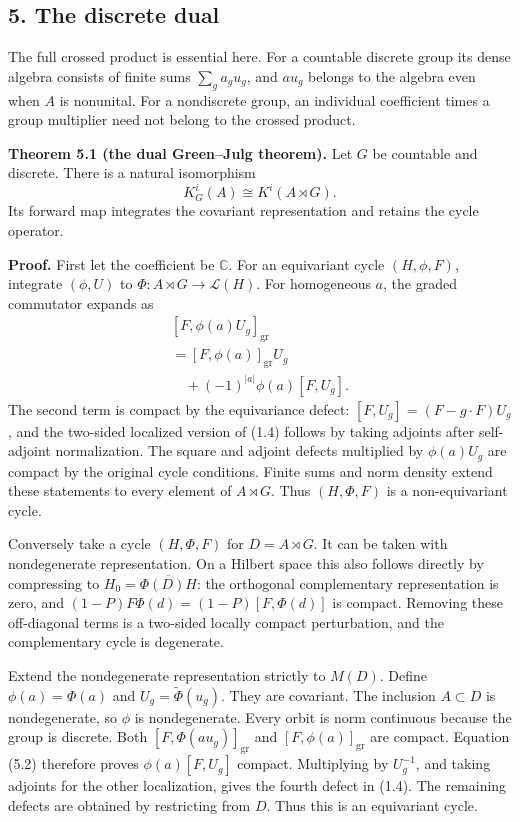 \documentclass[
  11pt,
]{article}
\begin{document}
\subsection{5. The discrete dual}\label{the-discrete-dual}

The full crossed product is essential here. For a countable discrete
group its dense algebra consists of finite sums \(\sum_g a_g u_g\), and
\(a u_g\) belongs to the algebra even when \(A\) is nonunital. For a
nondiscrete group, an individual coefficient times a group multiplier
need not belong to the crossed product.

\textbf{Theorem 5.1 (the dual Green--Julg theorem).} Let \(G\) be
countable and discrete. There is a natural isomorphism \[
K_G^i(A)\cong K^i(A\rtimes G).
\tag{5.1}
\] Its forward map integrates the covariant representation and retains
the cycle operator.

\textbf{Proof.} First let the coefficient be \(\mathbb C\). For an
equivariant cycle \((H,\phi,F)\), integrate \((\phi,U)\) to
\(\Phi:A\rtimes G\to\mathcal L(H)\). For homogeneous \(a\), the graded
commutator expands as \[
\begin{gathered}
{}[F,\phi(a)U_g]_{\mathrm{gr}}\\
 = [F,\phi(a)]_{\mathrm{gr}}U_g\\
 \quad+(-1)^{|a|}\phi(a)[F,U_g].
\end{gathered}
\tag{5.2}
\] The second term is compact by the equivariance defect:
\([F,U_g]=(F-g\cdot F)U_g\), and the two-sided localized version of
(1.4) follows by taking adjoints after self-adjoint normalization. The
square and adjoint defects multiplied by \(\phi(a)U_g\) are compact by
the original cycle conditions. Finite sums and norm density extend these
statements to every element of \(A\rtimes G\). Thus \((H,\Phi,F)\) is a
non-equivariant cycle.

Conversely take a cycle \((H,\Phi,F)\) for \(D=A\rtimes G\). It can be
taken with nondegenerate representation. On a Hilbert space this also
follows directly by compressing to \(H_0=\overline{\Phi(D)H}\): the
orthogonal complementary representation is zero, and
\((1-P)F\Phi(d)=(1-P)[F,\Phi(d)]\) is compact. Removing these
off-diagonal terms is a two-sided locally compact perturbation, and the
complementary cycle is degenerate.

Extend the nondegenerate representation strictly to \(M(D)\). Define
\(\phi(a)=\Phi(a)\) and \(U_g=\widetilde\Phi(u_g)\). They are covariant.
The inclusion \(A\subset D\) is nondegenerate, so \(\phi\) is
nondegenerate. Every orbit is norm continuous because the group is
discrete. Both \([F,\Phi(au_g)]_{\mathrm{gr}}\) and
\([F,\phi(a)]_{\mathrm{gr}}\) are compact. Equation (5.2) therefore
proves \(\phi(a)[F,U_g]\) compact. Multiplying by \(U_g^{-1}\), and
taking adjoints for the other localization, gives the fourth defect in
(1.4). The remaining defects are obtained by restricting from \(D\).
Thus this is an equivariant cycle.
\end{document}
